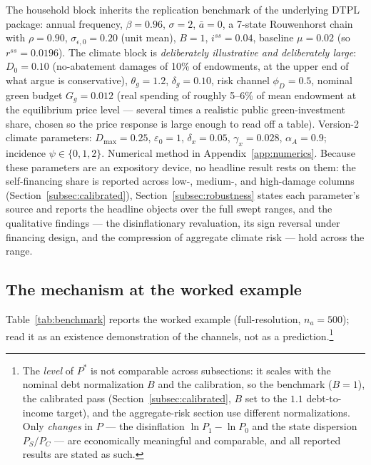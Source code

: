 \documentclass[12pt]{article}
\begin{document}
The household block inherits the replication benchmark of the underlying DTPL
package: annual frequency, $\beta=0.96$, $\sigma=2$, $\bar a=0$, a 7-state
Rouwenhorst chain with $\rho=0.90$, $\sigma_{\epsilon,0}=0.20$ (unit mean),
$B=1$, $i^{ss}=0.04$, baseline $\mu=0.02$ (so $r^{ss}=0.0196$). The climate
block is \emph{deliberately illustrative and deliberately large}: $D_0=0.10$
(no-abatement damages of 10\% of
endowments, at the upper end of what \citealp{bilalkanzig2024} argue is
conservative), $\theta_g=1.2$, $\delta_g=0.10$, risk channel $\phi_D=0.5$,
nominal green budget $G_g=0.012$ (real spending of roughly 5--6\% of mean
endowment at the equilibrium price level --- several times a realistic
public green-investment share, chosen so the price response is large enough
to read off a table). Version-2 climate parameters:
$D_{\max}=0.25$, $\varepsilon_0=1$, $\delta_x=0.05$, $\gamma_x=0.028$,
$\alpha_A=0.9$; incidence $\psi\in\{0,1,2\}$. Numerical method in
Appendix~\ref{app:numerics}. Because these parameters are an expository
device, no headline result rests on them: the self-financing share is
reported across low-, medium-, and high-damage columns
(Section~\ref{subsec:calibrated}), Section~\ref{subsec:robustness} states
each parameter's source and reports the headline objects over the full
swept ranges, and the qualitative findings --- the disinflationary
revaluation, its sign reversal under financing design, and the compression
of aggregate climate risk --- hold across the range.

\subsection{The mechanism at the worked example}

Table~\ref{tab:benchmark} reports the worked example (full-resolution,
$n_a=500$); read it as an existence demonstration of the channels, not as a
prediction.\footnote{The \emph{level} of $P^{*}$ is not comparable across
subsections: it scales with the nominal debt normalization $B$ and the
calibration, so the benchmark ($B=1$), the calibrated pass
(Section~\ref{subsec:calibrated}, $B$ set to the $1.1$ debt-to-income
target), and the aggregate-risk section use different normalizations. Only
\emph{changes} in $P$ --- the disinflation $\ln P_1-\ln P_0$ and the state
dispersion $P_S/P_C$ --- are economically meaningful and comparable, and all
reported results are stated as such.}
\end{document}
